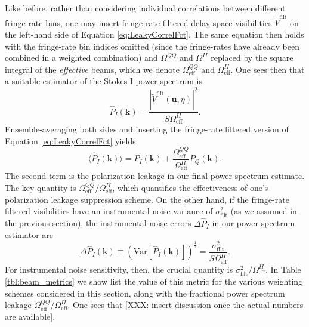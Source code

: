 \documentclass[twocolumn,apj,numberedappendix]{emulateapj}
\begin{document}
Like before, rather than considering individual correlations between different fringe-rate bins, one may
insert fringe-rate filtered delay-space visibilities $\widetilde{V}^\textrm{filt} $ on the left-hand side of Equation \eqref{eq:LeakyCorrelFct}. The
same equation then holds with the fringe-rate bin indices omitted (since the fringe-rates have already
been combined in a weighted combination) and $\Omega^{QQ}$ and $\Omega^{II}$ replaced
by the square integral of the \emph{effective} beams, which we denote $\Omega^{QQ}_\textrm{eff}$ and $\Omega^{II}_\textrm{eff}$. One sees then that a suitable estimator of
the Stokes I power spectrum is
\begin{equation}
\widehat{P}_I (\mathbf{k}) =\frac{ | \widetilde{V}^\textrm{filt} (\mathbf{u}, \eta) |^2}{S \Omega^{II}_\textrm{eff}}.
\end{equation}
Ensemble-averaging both sides and inserting the fringe-rate filtered version of Equation \eqref{eq:LeakyCorrelFct} yields
\begin{equation}
\langle \widehat{P}_I (\mathbf{k}) \rangle = P_I (\mathbf{k}) + \frac{\Omega^{QQ}_\textrm{eff}}{\Omega^{II}_\textrm{eff}} P_Q (\mathbf{k}).
\end{equation}
The second term is the polarization leakage in our final power spectrum estimate. The key quantity is $\Omega^{QQ}_\textrm{eff}/\Omega^{II}_\textrm{eff}$, which quantifies the effectiveness of
one's polarization leakage suppression scheme. On the other hand, if the fringe-rate filtered
visibilities have an instrumental noise variance of $\sigma^2_\textrm{filt}$ (as we assumed in the previous section),
the instrumental noise errors $\Delta \widehat{P}_I$ in our power spectrum estimator are
\begin{equation}
\Delta \widehat{P}_I (\mathbf{k}) \equiv \left(\textrm{Var} \left[\widehat{P}_I (\mathbf{k}) \right]\right)^\frac{1}{2} = \frac{\sigma^2_\textrm{filt}}{S\Omega^{II}_\textrm{eff}}.
\end{equation}
For instrumental noise sensitivity, then, the crucial quantity is $\sigma^2_\textrm{filt} / \Omega^{II}_\textrm{eff}$. In Table \ref{tbl:beam_metrics} we show list the value of this metric for the various
weighting schemes considered in this section, along with the fractional power spectrum
leakage $\Omega^{QQ}_\textrm{eff}/\Omega^{II}_\textrm{eff}$. One sees that [XXX: insert
discussion once the actual numbers are available].
\end{document}
